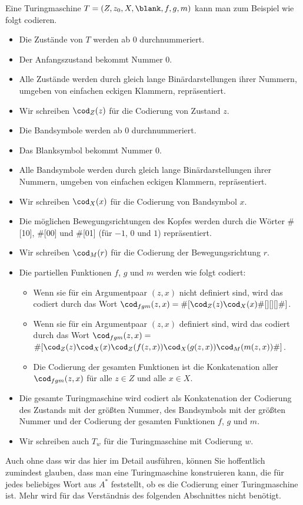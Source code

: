 Eine Turingmaschine $T=(Z,z_0,X, \blank,f,g,m)$ kann man zum Beispiel
wie folgt codieren.
\begin{itemize}
\item Die Zustände von $T$ werden ab $0$ durchnummeriert.
\item Der Anfangszustand bekommt Nummer $0$.
\item Alle Zustände werden durch gleich lange Binärdarstellungen ihrer
  Nummern, umgeben von einfachen eckigen Klammern, repräsentiert.
\item Wir schreiben $\cod_Z(z)$ für die Codierung von Zustand $z$.
\item Die Bandsymbole werden ab $0$ durchnummeriert.
\item Das Blanksymbol bekommt Nummer $0$.
\item Alle Bandsymbole werden durch gleich lange Binärdarstellungen
  ihrer Nummern, umgeben von einfachen eckigen Klammern, repräsentiert.
\item Wir schreiben $\cod_X(x)$ für die Codierung von Bandsymbol $x$.
\item Die möglichen Bewegungsrichtungen des Kopfes werden durch die
  Wörter \#{[10]}, \#{[00]} und \#{[01]} (für $-1$, $0$ und $1$)
  repräsentiert.
\item Wir schreiben $\cod_M(r)$ für die Codierung der
  Bewegungsrichtung $r$.
\item Die partiellen Funktionen $f$, $g$ und $m$ werden wie folgt
  codiert:
  \begin{itemize}
  \item Wenn sie für ein Argumentpaar $(z,x)$ nicht definiert sind,
    wird das codiert durch das Wort
    $\cod_{fgm}(z,x)=\#[\cod_Z(z)\cod_X(x)\#{[][][]}\#]$.
  \item Wenn sie für ein Argumentpaar $(z,x)$ definiert sind, wird das
    codiert durch das Wort $\cod_{fgm}(z,x)=$\\
    $\#[\cod_Z(z)\cod_X(x)\cod_Z(f(z,x))\cod_X(g(z,x))\cod_M(m(z,x))\#]$.
  \item Die Codierung der gesamten Funktionen ist die Konkatenation
    aller $\cod_{fgm}(z,x)$ für alle $z\in Z$ und alle $x\in X$.
  \end{itemize}
\item Die gesamte Turingmaschine wird codiert als Konkatenation der
  Codierung des Zustands mit der größten Nummer, des Bandsymbols mit
  der größten Nummer und der Codierung der gesamten Funktionen $f$,
  $g$ und $m$.
\item Wir schreiben auch $T_w$ für die Turingmaschine mit Codierung
  $w$.
\end{itemize}
%
Auch ohne dass wir das hier im Detail ausführen, können Sie
hoffentlich zumindest glauben, dass man eine Turingmaschine
konstruieren kann, die für jedes beliebiges Wort aus $A^*$ feststellt,
ob es die Codierung einer Turingmaschine ist. Mehr wird für das
Verständnis des folgenden Abschnittes nicht benötigt.

